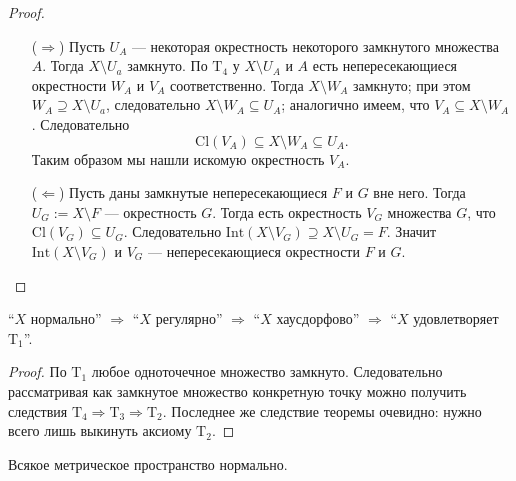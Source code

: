 \documentclass[12pt,a4paper]{article}
\newcommand{\Int}{\ensuremath{\mathrm{Int}}\xspace}
\newcommand{\Cl}{\ensuremath{\mathrm{Cl}}\xspace}
\newcommand{\T}{\ensuremath{\mathrm{T}}\xspace}
\begin{document}
    \begin{proof}
        \begin{itemize}
            \item[($\Rightarrow$)]
                Пусть $U_A$ --- некоторая окрестность некоторого замкнутого множества $A$. Тогда $X \setminus U_a$ замкнуто. По $\T_4$ у $X \setminus U_A$ и $A$ есть непересекающиеся окрестности $W_A$ и $V_A$ соответственно. Тогда $X \setminus W_A$ замкнуто; при этом $W_A \supseteq X \setminus U_a$, следовательно $X \setminus W_A \subseteq U_A$; аналогично имеем, что $V_A \subseteq X \setminus W_A$. Следовательно
                \[\Cl(V_A) \subseteq X \setminus W_A \subseteq U_A.\]
                Таким образом мы нашли искомую окрестность $V_A$.

            \item[($\Leftarrow$)]
                Пусть даны замкнутые непересекающиеся $F$ и $G$ вне него. Тогда $U_G := X \setminus F$ --- окрестность $G$. Тогда есть окрестность $V_G$ множества $G$, что $\Cl(V_G) \subseteq U_G$. Следовательно $\Int(X \setminus V_G) \supseteq X \setminus U_G = F$. Значит $\Int(X \setminus V_G)$ и $V_G$ --- непересекающиеся окрестности $F$ и $G$.
        \end{itemize}
    \end{proof}

    \begin{theorem}
        ``$X$ нормально'' $\Rightarrow$ ``$X$ регулярно'' $\Rightarrow$ ``$X$ хаусдорфово'' $\Rightarrow$ ``$X$ удовлетворяет $\T_1$''.
    \end{theorem}

    \begin{proof}
        По $\T_1$ любое одноточечное множество замкнуто. Следовательно рассматривая как замкнутое множество конкретную точку можно получить следствия $\T_4 \Rightarrow \T_3 \Rightarrow \T_2$. Последнее же следствие теоремы очевидно: нужно всего лишь выкинуть аксиому $\T_2$.
    \end{proof}

    \begin{theorem}
        Всякое метрическое пространство нормально.
    \end{theorem}
    
\end{document}
